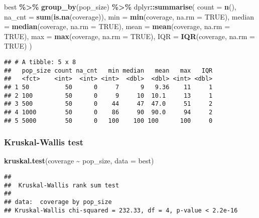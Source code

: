 \documentclass[
]{book}
\newenvironment{Shaded}{\begin{snugshade}}{\end{snugshade}}
\newcommand{\AttributeTok}[1]{\textcolor[rgb]{0.13,0.29,0.53}{#1}}
\newcommand{\ConstantTok}[1]{\textcolor[rgb]{0.56,0.35,0.01}{#1}}
\newcommand{\FunctionTok}[1]{\textcolor[rgb]{0.13,0.29,0.53}{\textbf{#1}}}
\newcommand{\NormalTok}[1]{#1}
\newcommand{\SpecialCharTok}[1]{\textcolor[rgb]{0.81,0.36,0.00}{\textbf{#1}}}
\begin{document}
\begin{Shaded}
\begin{Highlighting}[]
\NormalTok{best }\SpecialCharTok{\%\textgreater{}\%}
  \FunctionTok{group\_by}\NormalTok{(pop\_size) }\SpecialCharTok{\%\textgreater{}\%}
\NormalTok{  dplyr}\SpecialCharTok{::}\FunctionTok{summarise}\NormalTok{(}
    \AttributeTok{count =} \FunctionTok{n}\NormalTok{(),}
    \AttributeTok{na\_cnt =} \FunctionTok{sum}\NormalTok{(}\FunctionTok{is.na}\NormalTok{(coverage)),}
    \AttributeTok{min =} \FunctionTok{min}\NormalTok{(coverage, }\AttributeTok{na.rm =} \ConstantTok{TRUE}\NormalTok{),}
    \AttributeTok{median =} \FunctionTok{median}\NormalTok{(coverage, }\AttributeTok{na.rm =} \ConstantTok{TRUE}\NormalTok{),}
    \AttributeTok{mean =} \FunctionTok{mean}\NormalTok{(coverage, }\AttributeTok{na.rm =} \ConstantTok{TRUE}\NormalTok{),}
    \AttributeTok{max =} \FunctionTok{max}\NormalTok{(coverage, }\AttributeTok{na.rm =} \ConstantTok{TRUE}\NormalTok{),}
    \AttributeTok{IQR =} \FunctionTok{IQR}\NormalTok{(coverage, }\AttributeTok{na.rm =} \ConstantTok{TRUE}\NormalTok{)}
\NormalTok{  )}
\end{Highlighting}
\end{Shaded}

\begin{verbatim}
## # A tibble: 5 x 8
##   pop_size count na_cnt   min median   mean   max   IQR
##   <fct>    <int>  <int> <int>  <dbl>  <dbl> <int> <dbl>
## 1 50          50      0     7      9   9.36    11     1
## 2 100         50      0     9     10  10.1     13     1
## 3 500         50      0    44     47  47.0     51     2
## 4 1000        50      0    86     90  90.0     94     2
## 5 5000        50      0   100    100 100      100     0
\end{verbatim}

\hypertarget{kruskal-wallis-test-2}{%
\subsubsection{Kruskal-Wallis test}\label{kruskal-wallis-test-2}}

\begin{Shaded}
\begin{Highlighting}[]
\FunctionTok{kruskal.test}\NormalTok{(coverage }\SpecialCharTok{\textasciitilde{}}\NormalTok{ pop\_size, }\AttributeTok{data =}\NormalTok{ best)}
\end{Highlighting}
\end{Shaded}

\begin{verbatim}
## 
##  Kruskal-Wallis rank sum test
## 
## data:  coverage by pop_size
## Kruskal-Wallis chi-squared = 232.33, df = 4, p-value < 2.2e-16
\end{verbatim}
\end{document}
